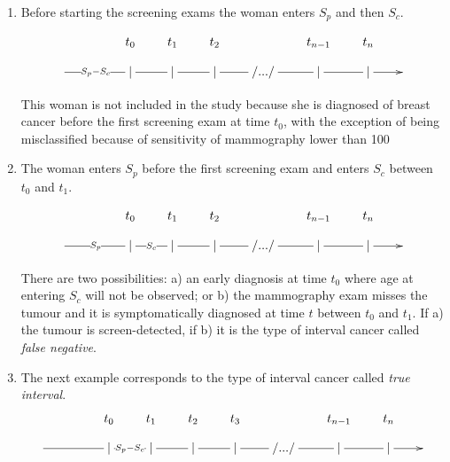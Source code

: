 %
\begin{enumerate}
\item Before starting the screening exams the woman enters $S_p$ and then $S_c$. 

\begin{displaymath}
\xymatrix @R=0.3cm @C=0.7cm {
& & t_0 & t_1 & t_2 &   & t_{n-1} & t_n \\
\ar@{-}[rr]|{S_p-S_c} & & | \ar@{-}[r] & | \ar@{-}[r] & | \ar@{-}[r] &  /.../ \ar@{-}[r] & | \ar@{-}[r] & | \ar@{->}[r] & \\
}
\end{displaymath}

This woman is not included in the study because she is diagnosed of breast cancer before the first screening exam at time $t_0$, with the exception of being misclassified because of sensitivity of mammography lower than 100%
%

\item The woman enters $S_p$ before the first screening exam and enters $S_c$ between $t_0$ and $t_1$. 

\begin{displaymath}
\xymatrix @R=0.3cm @C=0.7cm {
& & t_0 & t_1 & t_2 &  & t_{n-1} & t_n \\
\ar@{-}[rr]|{S_p} & & | \ar@{-}[r]|{S_c} & | \ar@{-}[r] & | \ar@{-}[r] & /.../ \ar@{-}[r] & | \ar@{-}[r] & | \ar@{->}[r] & \\
}
\end{displaymath}

There are two possibilities: a) an early diagnosis at time $t_0$ where age at entering $S_c$ will not be observed; or b) the mammography exam misses the tumour and it is symptomatically diagnosed at time $t$ between $t_0$ and $t_1$. If a) the tumour is screen-detected, if b) it is the type of interval cancer called \textit{false negative}.
%

\item The next example corresponds to the type of interval cancer called \textit{true interval}.
\begin{displaymath}
\xymatrix @R=0.3cm @C=0.7cm {
& & t_0 & t_1 & t_2 & t_3 &  & t_{n-1} & t_n \\
\ar@{-}[rr] & & | \ar@{-}[r]|{S_p-S_c} & | \ar@{-}[r] & | \ar@{-}[r] & | \ar@{-}[r] & /.../ \ar@{-}[r] & | \ar@{-}[r] & | \ar@{->}[r] & \\
}
\end{displaymath}

\end{enumerate}


